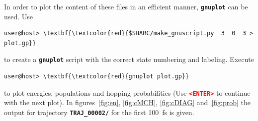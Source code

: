 \documentclass[a4paper,11pt,DIV=15,openany]{scrbook}
\newcommand{\ttt}[1]{\textbf{\texttt{#1}}}
\begin{document}
In order to plot the content of these files in an efficient manner, \ttt{gnuplot} can be used. Use
\begin{Verbatim}[commandchars=\\\{\}]
user@host> \textbf{\textcolor{red}{$SHARC/make_gnuscript.py  3  0  3 > plot.gp}}
\end{Verbatim}
to create a \ttt{gnuplot} script with the correct state numbering and labeling. Execute
\begin{Verbatim}[commandchars=\\\{\}]
user@host> \textbf{\textcolor{red}{gnuplot plot.gp}}
\end{Verbatim}
to plot energies, populations and hopping probabilities (Use \textcolor{red}{\ttt{<ENTER>}} to continue with the next plot). In figures~\ref{fig:en}, \ref{fig:cMCH}, \ref{fig:cDIAG} and~\ref{fig:prob} the output for trajectory \ttt{TRAJ\_00002/} for the first 100~fs is given.
\end{document}

